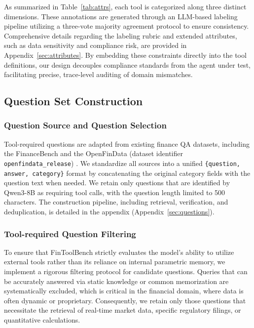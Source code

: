 \documentclass[sigconf,nonacm]{acmart}
\newcommand{\bench}{FinToolBench}
\begin{document}
As summarized in Table~\ref{tab:attrs}, each tool is categorized along three distinct dimensions. These annotations are generated through an LLM-based labeling pipeline utilizing a three-vote majority agreement protocol to ensure consistency. Comprehensive details regarding the labeling rubric and extended attributes, such as data sensitivity and compliance risk, are provided in Appendix~\ref{sec:attributes}. By embedding these constraints directly into the tool definitions, our design decouples compliance standards from the agent under test, facilitating precise, trace-level auditing of domain mismatches.


\subsection{Question Set Construction}
\label{subsec:questions}

\subsubsection{Question Source and Question Selection}
\label{subsec:question_sources}

Tool-required questions are adapted from existing finance QA datasets, including the FinanceBench \cite{islam2023financebench} and the OpenFinData (dataset identifier \texttt{openfindata\_}\allowbreak\texttt{release}) \cite{openfindata2023github}.
We standardize all sources into a unified \texttt{\{question, answer, category\}} format by concatenating the original category fields with the question text when needed.
We retain only questions that are identified by Qwen3-8B as requiring tool calls, with the question length limited to 500 characters.
The construction pipeline, including retrieval, verification, and deduplication, is detailed in the appendix (Appendix~\ref{sec:questions}).

\subsubsection{Tool-required Question Filtering}
\label{subsec:tool_required}

To ensure that \bench{} strictly evaluates the model's ability to utilize external tools rather than its reliance on internal parametric memory, we implement a rigorous filtering protocol for candidate questions.
Queries that can be accurately answered via static knowledge or common memorization are systematically excluded, which is critical in the financial domain, where data is often dynamic or proprietary.
Consequently, we retain only those questions that necessitate the retrieval of real-time market data, specific regulatory filings, or quantitative calculations.
\end{document}
